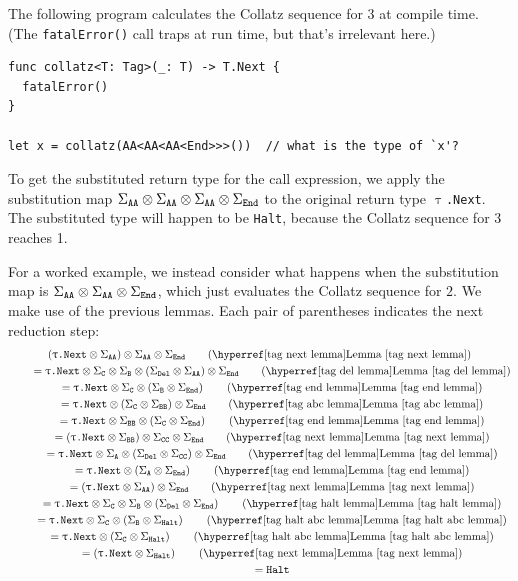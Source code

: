 \documentclass[../generics]{subfiles}
\begin{document}
\begin{example}
The following program calculates the Collatz sequence for $3$ at compile time. (The \texttt{fatalError()} call traps at run time, but that's irrelevant here.)
\begin{Verbatim}
func collatz<T: Tag>(_: T) -> T.Next {
  fatalError()
}

let x = collatz(AA<AA<AA<End>>>())  // what is the type of `x'?
\end{Verbatim}
To get the substituted return type for the call expression, we apply the substitution map $\Sigma_{\texttt{AA}}\otimes\Sigma_{\texttt{AA}}\otimes\Sigma_{\texttt{AA}}\otimes\Sigma_{\texttt{End}}$ to the original return type \texttt{$\uptau$.Next}. The substituted type will happen to be \texttt{Halt}, because the Collatz sequence for 3 reaches 1.

For a worked example, we instead consider what happens when the substitution map is $\Sigma_{\texttt{AA}} \otimes \Sigma_{\texttt{AA}} \otimes \Sigma_{\texttt{End}}$, which just evaluates the Collatz sequence for $2$. We make use of the previous lemmas. Each pair of parentheses indicates the next reduction step:
\begin{gather*}
\left(\TNext\otimes\SigmaAA\right)\otimes\SigmaAA\otimes\SigmaEnd \tag{\LemmaRef{tag next lemma}}\\
\qquad {} = \TNext \otimes \SigmaC \otimes \SigmaB \otimes \left(\SigmaDel \otimes \SigmaAA\right)\otimes\SigmaEnd \tag{\LemmaRef{tag del lemma}}\\
\qquad {} = \TNext \otimes \SigmaC \otimes \left(\SigmaB \otimes\SigmaEnd\right) \tag{\LemmaRef{tag end lemma}}\\
\qquad {} = \TNext \otimes \left(\SigmaC \otimes \SigmaBB\right) \otimes\SigmaEnd \tag{\LemmaRef{tag abc lemma}}\\
\qquad {} = \TNext \otimes \SigmaBB \otimes \left(\SigmaC \otimes\SigmaEnd\right) \tag{\LemmaRef{tag end lemma}}\\
\qquad {} = \left(\TNext\otimes\SigmaBB\right)\otimes\SigmaCC\otimes\SigmaEnd \tag{\LemmaRef{tag next lemma}}\\
\qquad {} = \TNext\otimes\SigmaA \otimes \left(\SigmaDel \otimes \SigmaCC\right)\otimes\SigmaEnd  \tag{\LemmaRef{tag del lemma}}\\
\qquad {} = \TNext\otimes\left(\SigmaA \otimes \SigmaEnd\right) \tag{\LemmaRef{tag end lemma}}\\
\qquad {} = \left(\TNext\otimes\SigmaAA\right) \otimes \SigmaEnd \tag{\LemmaRef{tag next lemma}}\\
\qquad {} = \TNext \otimes \SigmaC \otimes \SigmaB \otimes \left( \SigmaDel \otimes \SigmaEnd\right) \tag{\LemmaRef{tag halt lemma}}\\
\qquad {} = \TNext \otimes \SigmaC \otimes \left(\SigmaB \otimes \SigmaHalt\right) \tag{\LemmaRef{tag halt abc lemma}}\\
\qquad {} = \TNext \otimes \left(\SigmaC \otimes \SigmaHalt\right) \tag{\LemmaRef{tag halt abc lemma}}\\
\qquad {} = \left(\TNext \otimes \SigmaHalt\right) \tag{\LemmaRef{tag next lemma}}\\
\qquad {} = \Halt
\end{gather*}
\end{example}
\end{document}
